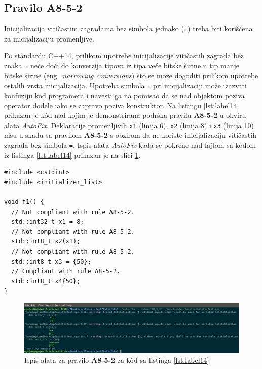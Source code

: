 \documentclass[12pt,oneside]{memoir}
\begin{document}
\subsection{Pravilo A8-5-2}
\begin{center}
\begin{tcolorbox}
Inicijalizacija viti\v{c}astim zagradama bez simbola jednako (\texttt{=}) treba biti kori\v{s}\'{c}ena za inicijalizaciju promenljive.
\end{tcolorbox}
\end{center}

Po standardu C++14, prilikom upotrebe inicijalizacije viti\v{c}astih zagrada bez znaka \texttt{=} ne\'{c}e do\'{c}i do konverzija tipova iz tipa ve\'{c}e bitske \v{s}irine u tip manje bitske \v{s}irine (eng.~\textit{narrowing conversions}) \v{s}to se moze dogoditi prilikom upotrebe ostalih vrsta inicijalizacija.
Upotreba simbola \texttt{=} pri inicijalizaciji mo\v{z}e izazvati konfuziju kod programera i navesti ga na pomisao da se nad objektom poziva operator dodele iako se zapravo poziva konstruktor.
Na listingu \ref{lst:label14} prikazan je k\^{o}d nad kojim je demonstrirana podr\v{s}ka pravilu \textbf{A8-5-2} u okviru alata \textit{AutoFix}.
Deklaracije promenljivih \texttt{x1} (linija 6), \texttt{x2} (linija 8) i \texttt{x3} (linija 10) nisu u skadu sa pravilom \textbf{A8-5-2} s obzirom da ne koriste inicijalizaciju viti\v{c}astih zagrada bez simbola \texttt{=}.
Ispis alata \textit{AutoFix} kada se pokrene nad fajlom sa kodom iz listinga \ref{lst:label14} prikazan je na slici \ref{fig:A8-5-2}. \\

\begin{lstlisting}[style=customc, caption={K\^{o}d nad kojim je demonstrirana podr\v{s}ka pravilu \textbf{A8-5-2} u okviru alata \textit{AutoFix}.}, label=lst:label14]
#include <cstdint>
#include <initializer_list>

void f1() {
  // Not compliant with rule A8-5-2.
  std::int32_t x1 = 8;
  // Not compliant with rule A8-5-2.
  std::int8_t x2(x1);
  // Not compliant with rule A8-5-2.
  std::int8_t x3 = {50};
  // Compliant with rule A8-5-2.
  std::int8_t x4{50};
}
\end{lstlisting}

\begin{figure}[!h]
\begin{center}
\includegraphics[scale=0.3]{A8_5_2.png}
\end{center}
\caption{Ispis alata za pravilo \textbf{A8-5-2} za k\^{o}d sa listinga \ref{lst:label14}.}
\label{fig:A8-5-2}
\end{figure}
\end{document}
